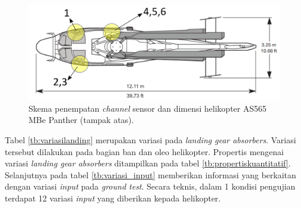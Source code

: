 \begin{figure}[H]
	\centering
	\includegraphics[width=0.75\linewidth]{gambar/tampak_atas.png}
	\caption{Skema penempatan \textit{channel} sensor dan dimensi helikopter AS565 MBe Panther (tampak atas).}
	\label{tampak_atas.png}
\end{figure}

Tabel \ref{tb:variasilanding} merupakan variasi pada \textit{landing gear absorbers}. Variasi tersebut dilakukan pada bagian ban dan oleo helikopter. Propertis mengenai variasi \textit{landing gear absorbers} ditampilkan pada tabel \ref{tb:propertiskuantitatif}. Selanjutnya pada tabel \ref{tb:variasi_input} memberikan informasi yang berkaitan dengan variasi \textit{input} pada \textit{ground test}. Secara teknis, dalam 1 kondisi pengujian terdapat 12 variasi \textit{input} yang diberikan kepada helikopter.


